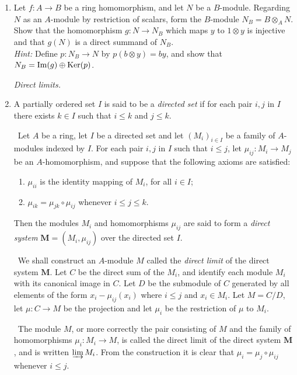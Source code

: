 \begin{enumerate}
    \item \label{exer13-chapter2}Let $f \colon A \to B$ be a ring homomorphism, and let $N$ be a $B$-module. Regarding $N$ as an $A$-module by restriction of scalars, form the $B$-module $N_B = B \otimes_A N$. Show that the homomorphism $g \colon N \to N_B$ which maps $y$ to $1 \otimes y$ is injective and that $g(N)$ is a direct summand of $N_B$.\\
    \textit{Hint:} Define $p \colon N_B \to N$ by $p(b \otimes y) = by$, and show that $N_B = \operatorname{Im}(g) \oplus \operatorname{Ker}(p)$.

    \emph{Direct limits.}

    \item \label{exer14-chapter2}A partially ordered set $I$ is said to be a \emph{directed set} if for each pair $i, j$ in $I$ there exists $k \in I$ such that $i \leq k$ and $j \leq k$.
    
    \quad\, Let $A$ be a ring, let $I$ be a directed set and let $(M_i)_{i \in I}$ be a family of $A$-modules indexed by $I$. For each pair $i, j$ in $I$ such that $i \leq j$, let $\mu_{ij} \colon M_i \to M_j$ be an $A$-homomorphism, and suppose that the following axioms are satisfied:
    \begin{enumerate}[(1)]
        \item $\mu_{ii}$ is the identity mapping of $M_i$, for all $i \in I$;
        \item $\mu_{ik} = \mu_{jk} \circ \mu_{ij}$ whenever $i \leq j \leq k$.
    \end{enumerate}
    Then the modules $M_i$ and homomorphisms $\mu_{ij}$ are said to form a \emph{direct system} $\mathbf{M} = (M_i, \mu_{ij})$ over the directed set $I$.

    \quad\, We shall construct an $A$-module $M$ called the \emph{direct limit} of the direct system $\mathbf{M}$. Let $C$ be the direct sum of the $M_i$, and identify each module $M_i$ with its canonical image in $C$. Let $D$ be the submodule of $C$ generated by all elements of the form $x_i - \mu_{ij}(x_i)$ where $i \leq j$ and $x_i \in M_i$. Let $M = C/D$, let $\mu \colon C \to M$ be the projection and let $\mu_i$ be the restriction of $\mu$ to $M_i$.

    \quad\, The module $M$, or more correctly the pair consisting of $M$ and the family of homomorphisms $\mu_i \colon M_i \to M$, is called the direct limit of the direct system $\mathbf{M}$, and is written $\varinjlim M_i$. From the construction it is clear that $\mu_i = \mu_j \circ \mu_{ij}$ whenever $i \leq j$.


\end{enumerate}
